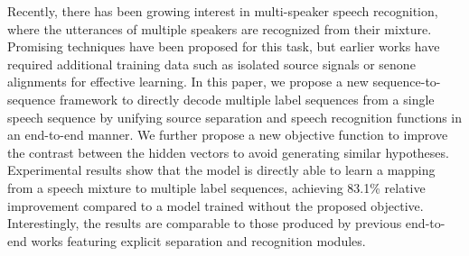 Recently, there has been growing interest in multi-speaker speech recognition, where the utterances of multiple speakers are recognized from their mixture. Promising techniques have been proposed for this task, but earlier works have required additional training data such as isolated source signals or senone alignments for effective learning. In this paper, we propose a new sequence-to-sequence framework to directly decode multiple label sequences from a single speech sequence by unifying source separation and speech recognition functions in an end-to-end manner. We further propose a new objective function to improve the contrast between the hidden vectors to avoid generating similar hypotheses. Experimental results show that the model is directly able to learn a mapping from a speech mixture to multiple label sequences, achieving 83.1\% relative improvement compared to a model trained without the proposed objective. Interestingly, the results are comparable to those produced by previous end-to-end works featuring explicit separation and recognition modules.
